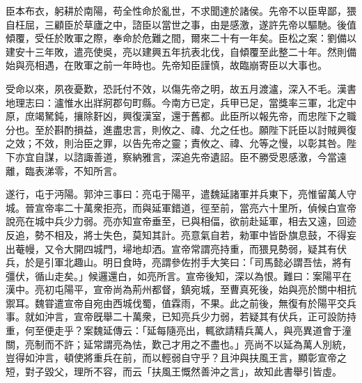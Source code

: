 \begin{pinyinscope}
臣本布衣，躬耕於南陽，苟全性命於亂世，不求聞達於諸侯。先帝不以臣卑鄙，猥自枉屈，三顧臣於草廬之中，諮臣以當世之事，由是感激，遂許先帝以驅馳。後值傾覆，受任於敗軍之際，奉命於危難之間，爾來二十有一年矣。臣松之案：劉備以建安十三年敗，遣亮使吳，亮以建興五年抗表北伐，自傾覆至此整二十年。然則備始與亮相遇，在敗軍之前一年時也。先帝知臣謹慎，故臨崩寄臣以大事也。

受命以來，夙夜憂歎，恐託付不效，以傷先帝之明，故五月渡瀘，深入不毛。漢書地理志曰：瀘惟水出牂牁郡句町縣。今南方已定，兵甲已足，當獎率三軍，北定中原，庶竭駑鈍，攘除姧凶，興復漢室，還于舊都。此臣所以報先帝，而忠陛下之職分也。至於斟酌損益，進盡忠言，則攸之、禕、允之任也。願陛下託臣以討賊興復之效；不效，則治臣之罪，以告先帝之靈；責攸之、禕、允等之慢，以彰其咎。陛下亦宜自謀，以諮諏善道，察納雅言，深追先帝遺詔。臣不勝受恩感激，今當遠離，臨表涕零，不知所言。

遂行，屯于沔陽。郭沖三事曰：亮屯于陽平，遣魏延諸軍并兵東下，亮惟留萬人守城。晉宣帝率二十萬衆拒亮，而與延軍錯道，徑至前，當亮六十里所，偵候白宣帝說亮在城中兵少力弱。亮亦知宣帝垂至，已與相偪，欲前赴延軍，相去又遠，回迹反追，勢不相及，將士失色，莫知其計。亮意氣自若，勑軍中皆卧旗息鼓，不得妄出菴幔，又令大開四城門，埽地却洒。宣帝常謂亮持重，而猥見勢弱，疑其有伏兵，於是引軍北趣山。明日食時，亮謂參佐拊手大笑曰：「司馬懿必謂吾怯，將有彊伏，循山走矣。」候邏還白，如亮所言。宣帝後知，深以為恨。難曰：案陽平在漢中。亮初屯陽平，宣帝尚為荊州都督，鎮宛城，至曹真死後，始與亮於關中相抗禦耳。魏甞遣宣帝自宛由西城伐蜀，值霖雨，不果。此之前後，無復有於陽平交兵事。就如沖言，宣帝旣舉二十萬衆，已知亮兵少力弱，若疑其有伏兵，正可設防持重，何至便走乎？案魏延傳云：「延每隨亮出，輒欲請精兵萬人，與亮異道會于潼關，亮制而不許；延常謂亮為怯，歎己才用之不盡也。」亮尚不以延為萬人別統，豈得如沖言，頓使將重兵在前，而以輕弱自守乎？且沖與扶風王言，顯彰宣帝之短，對子毀父，理所不容，而云「扶風王慨然善沖之言」，故知此書舉引皆虛。


\end{pinyinscope}
